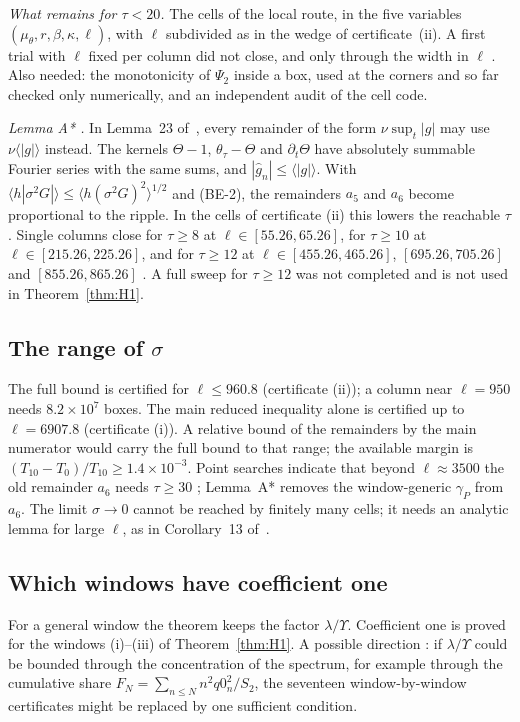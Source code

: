 \emph{What remains for $\tau<20$.}
The cells of the local route, in the five variables $(\mu_\theta,r,\beta,\kappa,\ell)$, with $\ell$ subdivided as in the wedge of certificate~(ii).
A first trial with $\ell$ fixed per column did not close, and only through the width in $\ell$ \numst.
Also needed: the monotonicity of $\Psi_2$ inside a box, used at the corners and so far checked only numerically, and an independent audit of the cell code.

\emph{Lemma A* \proofst.}
In Lemma~23 of~\cite{F}, every remainder of the form $\nu\sup_t|g|$ may use $\nu\langle|g|\rangle$ instead.
The kernels $\Theta-1$, $\theta_\tau-\Theta$ and $\partial_t\Theta$ have absolutely summable Fourier series with the same sums, and $|\hat g_n|\le\langle|g|\rangle$.
With $\langle h|\sigma^2G|\rangle\le\langle h(\sigma^2G)^2\rangle^{1/2}$ and (BE-2), the remainders $a_5$ and $a_6$ become proportional to the ripple.
In the cells of certificate (ii) this lowers the reachable $\tau$.
Single columns close for $\tau\ge8$ at $\ell\in[55.26,65.26]$, for $\tau\ge10$ at $\ell\in[215.26,225.26]$, and for $\tau\ge12$ at $\ell\in[455.26,465.26]$, $[695.26,705.26]$ and $[855.26,865.26]$ .
A full sweep for $\tau\ge12$ was not completed and is not used in Theorem~\ref{thm:H1}.

\subsection{The range of \texorpdfstring{$\sigma$}{sigma}}
\label{sec:open:sigma}
The full bound is certified for $\ell\le960.8$ (certificate (ii)); a column near $\ell=950$ needs $8.2\times10^{7}$ boxes.
The main reduced inequality alone is certified up to $\ell=6907.8$ (certificate (i)).
A relative bound of the remainders by the main numerator would carry the full bound to that range; the available margin is $(T_{10}-T_0)/T_{10}\ge1.4\times10^{-3}$.
Point searches indicate that beyond $\ell\approx3500$ the old remainder $a_6$ needs $\tau\ge30$ \numst; Lemma~A* removes the window-generic $\gamma_P$ from $a_6$.
The limit $\sigma\to0$ cannot be reached by finitely many cells; it needs an analytic lemma for large $\ell$, as in Corollary~13 of~\cite{F}.

\subsection{Which windows have coefficient one}
\label{sec:open:windows}
For a general window the theorem keeps the factor $\lambda/\Upsilon$.
Coefficient one is proved for the windows (i)--(iii) of Theorem~\ref{thm:H1}.
A possible direction \conjst: if $\lambda/\Upsilon$ could be bounded through the concentration of the spectrum, for example through the cumulative share $F_N=\sum_{n\le N}n^2q0_n^2/S_2$, the seventeen window-by-window certificates might be replaced by one sufficient condition.

